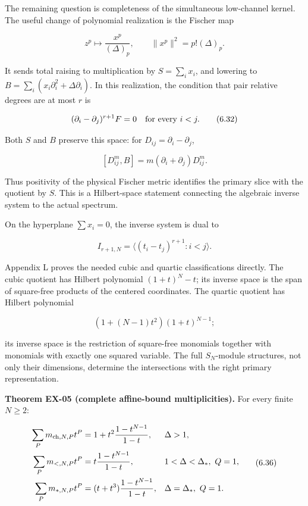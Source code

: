 The remaining question is completeness of the simultaneous low-channel kernel. The useful change of polynomial realization is the Fischer map

\[
z^p\longmapsto\frac{x^p}{(\Delta)_p},\qquad
\|x^p\|^2=p!(\Delta)_p.
\tag{6.31}
\]

It sends total raising to multiplication by \(S=\sum_i x_i\), and lowering to \(B=\sum_i(x_i\partial_i^2+\Delta\partial_i)\). In this realization, the condition that pair relative degrees are at most \(r\) is

\[
(\partial_i-\partial_j)^{r+1}F=0\quad\hbox{for every }i<j.
\tag{6.32}
\]

Both \(S\) and \(B\) preserve this space: for \(D_{ij}=\partial_i-\partial_j\),

\[
[D_{ij}^m,B]=m(\partial_i+\partial_j)D_{ij}^m.
\tag{6.33}
\]

Thus positivity of the physical Fischer metric identifies the primary slice with the quotient by \(S\). This is a Hilbert-space statement connecting the algebraic inverse system to the actual spectrum.

On the hyperplane \(\sum x_i=0\), the inverse system is dual to

\[
I_{r+1,N}=\langle(t_i-t_j)^{r+1}:i<j\rangle.
\tag{6.34}
\]

Appendix L proves the needed cubic and quartic classifications directly. The cubic quotient has Hilbert polynomial \((1+t)^N-t\); its inverse space is the span of square-free products of the centered coordinates. The quartic quotient has Hilbert polynomial

\[
(1+(N-1)t^2)(1+t)^{N-1};
\tag{6.35}
\]

its inverse space is the restriction of square-free monomials together with monomials with exactly one squared variable. The full \(S_N\)-module structures, not only their dimensions, determine the intersections with the right primary representation.

\textbf{Theorem EX-05 (complete affine-bound multiplicities).} For every finite \(N\ge2\):

\[
\begin{aligned}
\sum_Pm_{{\rm ch},N,P}t^P&=1+t^2\frac{1-t^{N-1}}{1-t},&&\Delta>1,\\
\sum_Pm_{<,N,P}t^P&=t\frac{1-t^{N-1}}{1-t},&&1<\Delta<\Delta_*,\ Q=1,\\
\sum_Pm_{*,N,P}t^P&=(t+t^3)\frac{1-t^{N-1}}{1-t},&&\Delta=\Delta_*,\ Q=1.
\end{aligned}
\tag{6.36}
\]

